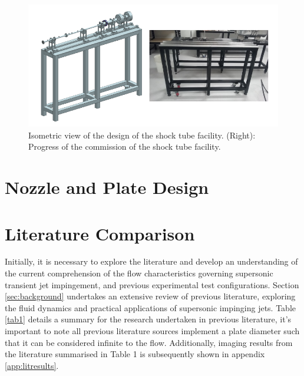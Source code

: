 \begin{figure}[H] 
	\centering
	\includegraphics[width=1.05\textwidth]{fig8.PNG} 
	\caption{Isometric view of the design of the shock tube facility. (Right): Progress of the commission
		of the shock tube facility.}
	\label{fig:8}
\end{figure}

\section{Nozzle and Plate Design} \label{app:drawings}












\section{Literature Comparison}
Initially, it is necessary to explore the literature and develop an understanding of the current comprehension of the flow characteristics governing supersonic transient jet impingement, and previous experimental test configurations. Section \ref{sec:background} undertakes an extensive review of previous literature, exploring the fluid dynamics and practical applications of supersonic impinging jets. Table \ref{tab1} details a summary for the research undertaken in previous literature, it's important to note all previous literature sources implement a plate diameter such that it can be considered infinite to the flow. Additionally, imaging results from the literature summarised in Table 1 is subsequently shown in appendix \ref{app:litresults}.

